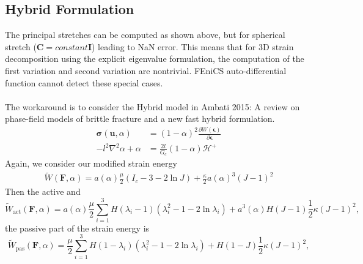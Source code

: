 \documentclass[12pt,3p]{article}
\numberwithin{equation}{section}
\begin{document}
\subsection{Hybrid Formulation}
The principal stretches can be computed as shown above, but for spherical stretch ($\mathbf{C}= constant \mathbf{I}$) leading to NaN error. This means that for 3D strain decomposition using the explicit eigenvalue formulation, the computation of the first variation and second variation are nontrivial. FEniCS auto-differential function cannot detect these special cases.  \\ \\
The workaround is to consider the Hybrid model in Ambati 2015: A review on phase-field models of brittle fracture and a new fast hybrid formulation.
\begin{align*}
\mathbf{\sigma} (\mathbf{u}, \alpha) &= (1- \alpha)^2 \frac{\partial W (\mathbf{\epsilon})}{\partial \mathbf{\epsilon}} \\
- l^2 \nabla^2 \alpha + \alpha &= \frac{2 l}{G_c} (1-\alpha) \mathcal{H}^+
\end{align*}
Again, we consider our modified strain energy 
\begin{align*}
\widetilde{W} (\mathbf{F}, \alpha) = a(\alpha) \frac{\mu}{2} (I_c - 3 - 2 \ln J) + \frac{\kappa}{2} a(\alpha)^3 (J-1)^2
\end{align*}
Then the active and
\begin{equation}
\widetilde{W}_\text{act}\left(\mathbf{F},\alpha\right)=a(\alpha)\frac{\mu}{2}\sum_{i=1}^{3}H(\lambda_i-1)\left(\lambda_i^2-1-2\ln\lambda_i\right) + a^3(\alpha)H(J-1)\frac{1}{2}\kappa\left(J-1\right)^2,
\end{equation}
the passive part of the strain energy is
\begin{equation}
\widetilde{W}_\text{pas}\left(\mathbf{F},\alpha\right) = \frac{\mu}{2}\sum_{i=1}^{3}H(1-\lambda_i)\left(\lambda_i^2-1-2\ln\lambda_i\right) + H(1-J)\frac{1}{2}\kappa\left(J-1\right)^2,
\end{equation}

\newpage
\end{document}
